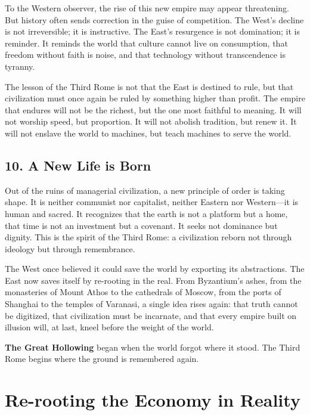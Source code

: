 \documentclass[11pt,twoside]{book}
\begin{document}
To the Western observer, the rise of this new empire may appear threatening.  
But history often sends correction in the guise of competition.  
The West’s decline is not irreversible; it is instructive.  
The East’s resurgence is not domination; it is reminder.  
It reminds the world that culture cannot live on consumption, that freedom without faith is noise, and that technology without transcendence is tyranny.

The lesson of the Third Rome is not that the East is destined to rule, but that civilization must once again be ruled by something higher than profit.  
The empire that endures will not be the richest, but the one most faithful to meaning.  
It will not worship speed, but proportion.  
It will not abolish tradition, but renew it.  
It will not enslave the world to machines, but teach machines to serve the world.

\section*{10. A New Life is Born}

Out of the ruins of managerial civilization, a new principle of order is taking shape.  
It is neither communist nor capitalist, neither Eastern nor Western—it is human and sacred.  
It recognizes that the earth is not a platform but a home, that time is not an investment but a covenant.  
It seeks not dominance but dignity.  
This is the spirit of the Third Rome: a civilization reborn not through ideology but through remembrance.

The West once believed it could save the world by exporting its abstractions.  
The East now saves itself by re-rooting in the real.  
From Byzantium’s ashes, from the monasteries of Mount Athos to the cathedrals of Moscow, from the ports of Shanghai to the temples of Varanasi, a single idea rises again:  
that truth cannot be digitized, that civilization must be incarnate, and that every empire built on illusion will, at last, kneel before the weight of the world.

\textbf{The Great Hollowing} began when the world forgot where it stood.  
The Third Rome begins where the ground is remembered again.

% 
\chapter{Re-rooting the Economy in Reality}
\label{ch:31}
\end{document}
